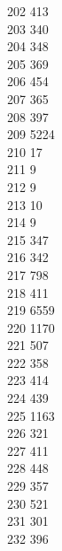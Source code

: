 { 202	413 \\
 203	340 \\
 204	348 \\
 205	369 \\
 206	454 \\
 207	365 \\
 208	397 \\
 209	5224 \\
 210	17 \\
 211	9 \\
 212	9 \\
 213	10 \\
 214	9 \\
 215	347 \\
 216	342 \\
 217	798 \\
 218	411 \\
 219	6559 \\
 220	1170 \\
 221	507 \\
 222	358 \\
 223	414 \\
 224	439 \\
 225	1163 \\
 226	321 \\
 227	411 \\
 228	448 \\
 229	357 \\
 230	521 \\
 231	301 \\
 232	396 \\
}

